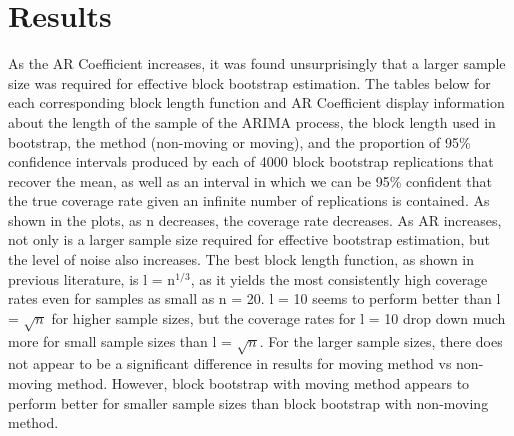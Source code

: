 \documentclass[12pt, letterpaper, titlepage]{article}
\begin{document}
 

\section{Results}
\label{sec:results}

As the AR Coefficient increases, it was found unsurprisingly that a larger sample size was 
required for effective block bootstrap estimation. The tables below for each corresponding block length function and AR Coefficient display information about the length of the sample of the ARIMA process, the block length used in bootstrap, the method (non-moving or moving), and the proportion of 95\% confidence intervals produced by each of 4000 block bootstrap replications that recover the mean, as well as an interval in which we can be 95\% confident that the true coverage rate given an infinite number of replications is contained. 
As shown in the plots, as n decreases, the coverage rate decreases. As AR increases, not only is a larger sample size required for effective bootstrap estimation, but the level of noise also increases. The best block length function, as shown in previous literature, \citep{buhlmann1999block} is l = n$^{1/3}$, as it yields the most consistently high coverage rates even for samples as small as n = 20. l = 10 seems to perform better than l = $\sqrt{n}$ for higher sample sizes, but the coverage rates for l = 10 drop down much more for small sample sizes than l = $\sqrt{n}$. For the larger sample sizes, there does not appear to be a significant difference in results for moving method vs non-moving method. However, block bootstrap with moving method appears to perform better for smaller sample sizes than block bootstrap with non-moving method.
\end{document}

